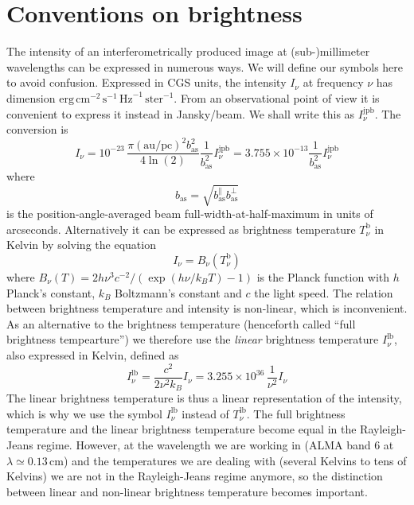 \documentclass{aa}
\begin{document}
\section{Conventions on brightness}
\label{sec-conventions}
%
The intensity of an interferometrically produced image at (sub-)millimeter
wavelengths can be expressed in numerous ways. We will define our symbols here
to avoid confusion. Expressed in CGS units, the intensity $I_\nu$ at frequency
$\nu$ has dimension
$\mathrm{erg}\,\mathrm{cm}^{-2}\,\mathrm{s}^{-1}\,\mathrm{Hz}^{-1}\,\mathrm{ster}^{-1}$.
From an observational point of view it is convenient to express it instead in
Jansky/beam. We shall write this as $I_\nu^{\mathrm{jpb}}$. The conversion is
\begin{equation}
  I_\nu = 10^{-23}\,\frac{\pi(\mathrm{au}/\mathrm{pc})^2 b_{\mathrm{as}}^2}{4\ln(2)}\frac{1}{b^2_{\mathrm{as}}}I_\nu^{\mathrm{jpb}}
  = 3.755\times 10^{-13}\frac{1}{b^2_{\mathrm{as}}}I_\nu^{\mathrm{jpb}}
\end{equation}
where
\begin{equation}\label{eq-def-average-beam}
b_{\mathrm{as}}=\sqrt{b_{\mathrm{as}}^{\parallel}b_{\mathrm{as}}^{\bot}}
\end{equation}
is the position-angle-averaged beam full-width-at-half-maximum in units of
arcseconds. Alternatively it can be expressed as brightness temperature
$T_\nu^{\mathrm{b}}$ in Kelvin by solving the equation
\begin{equation}
I_\nu = B_\nu(T_\nu^{\mathrm{b}})
\end{equation}
where $B_\nu(T)=2h\nu^3c^{-2}/(\exp(h\nu/k_BT)-1)$ is the Planck function with $h$
Planck's constant, $k_B$ Boltzmann's constant and $c$ the light speed. The
relation between brightness temperature and intensity is non-linear, which is
inconvenient. As an alternative to the brightness temperature (henceforth called
``full brightness tempearture'') we therefore use the {\em linear} brightness
temperature $I_\nu^{\mathrm{lb}}$, also expressed in Kelvin, defined as
\begin{equation}
I_\nu^{\mathrm{lb}} = \frac{c^2}{2\nu^2k_B}I_\nu
  = 3.255\times 10^{36}\, \frac{1}{\nu^2}I_\nu
\end{equation}
The linear brightness temperature is thus a linear representation of the
intensity, which is why we use the symbol $I_\nu^{\mathrm{lb}}$ instead of
$T_\nu^{\mathrm{lb}}$. The full brightness temperature and the linear brightness
temperature become equal in the Rayleigh-Jeans regime. However, at the
wavelength we are working in (ALMA band 6 at $\lambda\simeq 0.13\,\mathrm{cm}$)
and the temperatures we are dealing with (several Kelvins to tens of Kelvins) we
are not in the Rayleigh-Jeans regime anymore, so the distinction between linear
and non-linear brightness temperature becomes important. 
\end{document}
